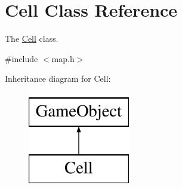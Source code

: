 \hypertarget{class_cell}{\section{\-Cell \-Class \-Reference}
\label{class_cell}
}


\-The \hyperlink{class_cell}{\-Cell} class.  




{\ttfamily \#include $<$map.\-h$>$}

\-Inheritance diagram for \-Cell\-:\begin{figure}[H]
\begin{center}
\leavevmode
\includegraphics[height=4.000000cm]{class_cell}
\end{center}
\end{figure}
